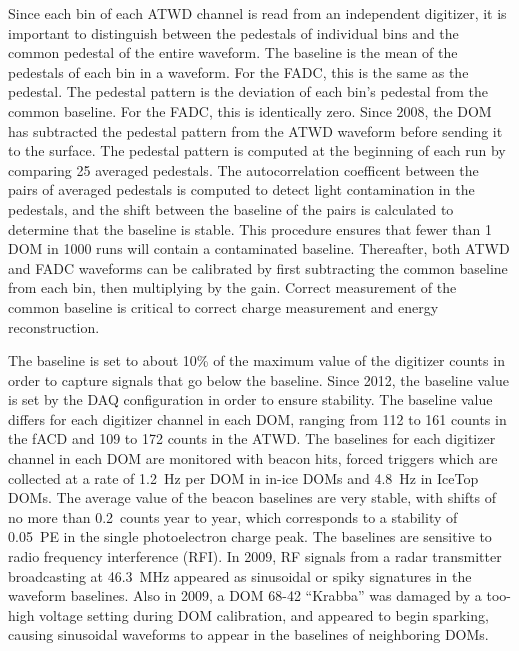 Since each bin of each ATWD channel is read from an independent
digitizer, it is important to distinguish between the pedestals of
individual bins and the common pedestal of the entire waveform. The
baseline is the mean of the pedestals of each bin in a waveform. For
the FADC, this is the same as the pedestal. The pedestal pattern is
the deviation of each bin's pedestal from the common baseline. For the
FADC, this is identically zero. Since 2008, the DOM has subtracted the
pedestal pattern from
the ATWD waveform before sending it to the surface. The pedestal pattern is computed at the beginning of each
run by comparing 25 averaged pedestals. The autocorrelation coefficent
between the pairs of averaged pedestals is computed to detect light
contamination in the pedestals, and the shift between the baseline of
the pairs is calculated to determine that the baseline is stable. This
procedure ensures that fewer than 1 DOM in 1000 runs will contain a
contaminated baseline. Thereafter, both ATWD
and FADC waveforms can be calibrated by first subtracting the common
baseline from each bin, then multiplying by the gain. Correct
measurement of the common baseline is critical to correct charge
measurement and energy reconstruction.

The baseline is set to about 10\% of the maximum value of the
digitizer counts in
order to capture signals that go below the baseline. Since 2012, the baseline value is set by the DAQ configuration in order to ensure
stability. The baseline value differs for each digitizer channel in
each DOM, ranging from 112 to 161 counts in the fACD and 109 to 172
counts in the ATWD. The baselines for each digitizer channel in each DOM are monitored with
beacon hits, forced triggers which are collected at a rate of 1.2~Hz
per DOM
in in-ice DOMs and 4.8~Hz in IceTop DOMs. The average value of the
beacon baselines are very stable, with shifts of no more than
0.2~counts year to year, which corresponds to a stability of 0.05~PE
in the single photoelectron charge peak. 
The baselines are sensitive to radio frequency interference (RFI). In
2009, RF signals from a radar transmitter broadcasting at 46.3~MHz
appeared as sinusoidal or spiky signatures in the waveform
baselines. Also in 2009, a DOM 68-42 ``Krabba'' was damaged by a too-high
voltage setting during DOM calibration, and appeared to begin
sparking, causing sinusoidal waveforms to appear in the baselines of
neighboring DOMs.

